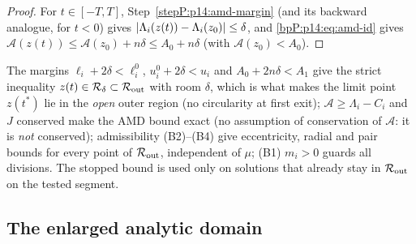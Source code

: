 \begin{proof}
\label{stepP:p14:amd-d} For $t\in[-T,T]$, Step~\ref{stepP:p14:amd-margin} (and its backward analogue, for $t<0$) gives $\lvert \Lambda_i(z(t))-\Lambda_i(z_0)\rvert\le\delta$, and \eqref{bpP:p14:eq:amd-id} gives $\mathcal A(z(t))\le\mathcal A(z_0)+n\delta\le A_0+n\delta$ (with $\mathcal A(z_0)<A_0$).
\end{proof}

\begin{remark}\label{bpP:p14:amd-uses}
The margins $\ell_i+2\delta<\ell_i^0$, $u_i^0+2\delta<u_i$ and $A_0+2n\delta<A_1$ give the strict inequality $z(t)\in\mathcal R_\delta\subset\mathcal R_{\rm out}$ with room $\delta$, which is what makes the limit point $z(t^*)$ lie in the \emph{open} outer region (no circularity at first exit); $\mathcal A\ge\Lambda_i-C_i$ and $J$ conserved make the AMD bound exact (no assumption of conservation of $\mathcal A$: it is \emph{not} conserved); admissibility (B2)--(B4) give eccentricity, radial and pair bounds for every point of $\mathcal R_{\rm out}$, independent of $\mu$; (B1) $m_i>0$ guards all divisions. The stopped bound is used only on solutions that already stay in $\mathcal R_{\rm out}$ on the tested segment.
\end{remark}

\subsection{The enlarged analytic domain}\label{bpP:p14:sec-domain}

